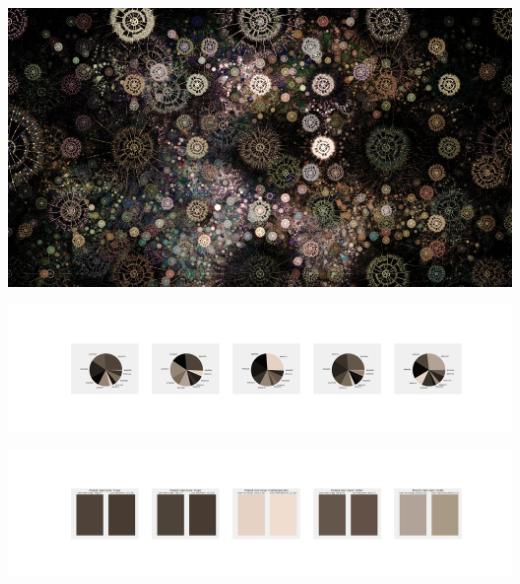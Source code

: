 \documentclass[11pt]{article}
\begin{document}
\begin{landscape}
    \begin{center}
    \includegraphics[width=\textwidth]{./nbimg/file (13).jpg}
    \end{center}

    \begin{center}
    \includegraphics[width=250mm]{./nbimg/pie-34.jpg}
    \end{center}

    \begin{center}
    \includegraphics[width=250mm]{./nbimg/peak-34.jpg}
    \end{center}
    


\end{landscape}
\end{document}
